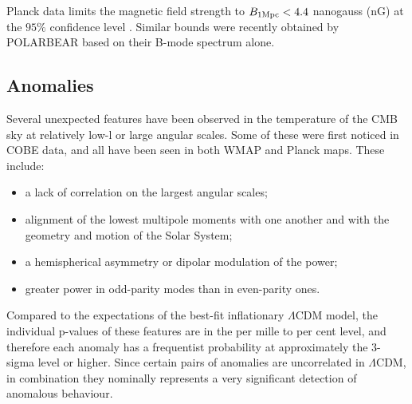 Planck data limits the magnetic field strength to $B_{1 {\rm Mpc}}<4.4$ nanogauss (nG) at the $95\%$ confidence level \cite{Ade:2015cva}. Similar bounds were recently obtained by POLARBEAR \cite{Ade:2015cao} based on their B-mode spectrum alone.



\subsection{Anomalies}

Several unexpected features have been observed in the temperature of the CMB sky at relatively low-l or large angular scales.  Some of these were first noticed in COBE data,  
and all have been seen in both WMAP and Planck maps.  These include: 
\begin{itemize}
  \item a lack of correlation on the largest angular scales;
  \item alignment of the lowest multipole moments with one another and with the geometry and motion of the Solar System;
  \item a hemispherical asymmetry or dipolar modulation of the power; 
  \item greater power in odd-parity modes than in even-parity ones.
\end{itemize}

Compared to the expectations of the best-fit inflationary $\Lambda$CDM model, the individual p-values of these features are in the per mille to per cent level, and therefore each anomaly has a frequentist probability at approximately the 3-sigma level or higher.  Since certain pairs of anomalies are uncorrelated in $\Lambda$CDM, in combination they nominally represents a very significant detection of anomalous behaviour. 

